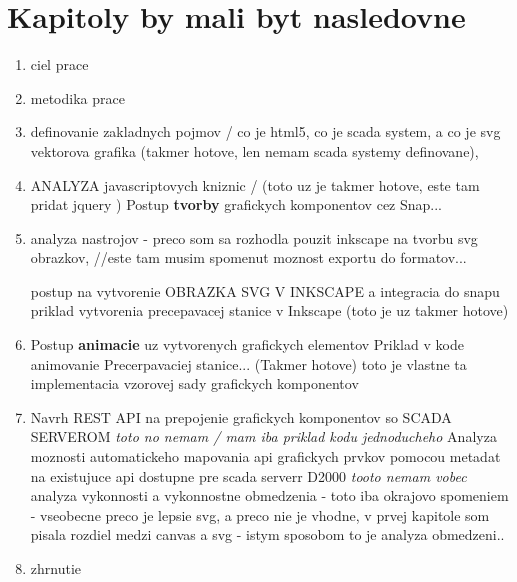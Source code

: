 \section{Kapitoly by mali byt nasledovne}
\begin{enumerate}
	\item ciel prace 
	\item metodika prace
	\item definovanie zakladnych pojmov / co je html5, co je scada system, a co je svg vektorova grafika (takmer hotove, len nemam scada systemy definovane), 

	\item ANALYZA javascriptovych kniznic / (toto uz je takmer hotove, este tam pridat jquery )
	\subitem Postup \textbf{tvorby} grafickych komponentov cez Snap...
		\item analyza nastrojov - preco som sa rozhodla pouzit inkscape na tvorbu svg obrazkov, //este tam musim spomenut moznost exportu do formatov... 
		
		\subitem postup na vytvorenie OBRAZKA SVG V INKSCAPE a integracia do snapu  \cite[p.~82-5]{Dawber} 
		\subitem priklad vytvorenia precepavacej stanice v Inkscape (toto je uz takmer hotove) 
	\item Postup \textbf{animacie} uz vytvorenych grafickych elementov 
	\subitem Priklad v kode animovanie Precerpavaciej stanice... (Takmer hotove) toto je vlastne ta implementacia vzorovej sady grafickych komponentov
	\item Navrh REST API na prepojenie grafickych komponentov so SCADA SERVEROM  \textit{toto no nemam / mam iba priklad kodu jednoducheho }
	\subitem Analyza moznosti automatickeho mapovania api grafickych prvkov pomocou metadat na existujuce api dostupne pre scada serverr D2000 \textit{tooto nemam vobec}
	\subitem analyza vykonnosti a vykonnostne obmedzenia - toto iba okrajovo spomeniem - vseobecne preco je lepsie svg, a preco nie je vhodne, v prvej kapitole som pisala rozdiel medzi canvas a svg - istym sposobom to je analyza obmedzeni.. 
	\item zhrnutie
	
\end{enumerate}

